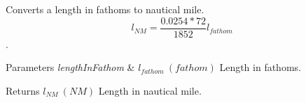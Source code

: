 Converts a length in fathoms to nautical mile. \[ l_{NM}= \frac{0.0254 * 72}{1852} l_{fathom} \]. 


\begin{DoxyParams}{Parameters}
{\em length\+In\+Fathom} & $ l_{fathom}\ (fathom)$ Length in fathoms. \\
\hline
\end{DoxyParams}
\begin{DoxyReturn}{Returns}
$ l_{NM}\ (NM)$ Length in nautical mile. 
\end{DoxyReturn}
